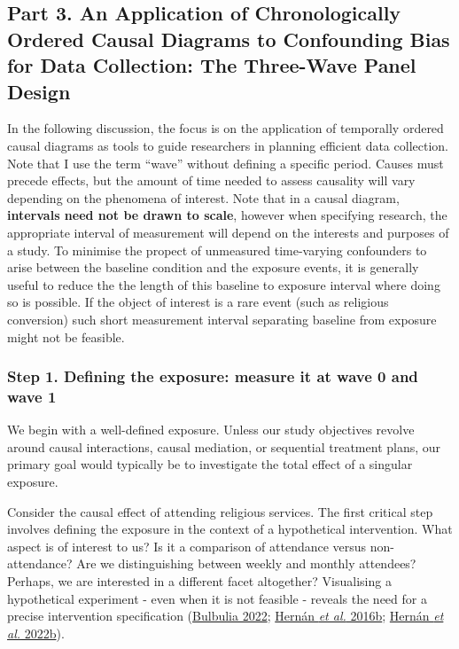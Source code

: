 \documentclass[
  singlecolumn]{article}
\begin{document}
\hypertarget{part-3.-an-application-of-chronologically-ordered-causal-diagrams-to-confounding-bias-for-data-collection-the-three-wave-panel-design}{%
\subsection{Part 3. An Application of Chronologically Ordered Causal
Diagrams to Confounding Bias for Data Collection: The Three-Wave Panel
Design}\label{part-3.-an-application-of-chronologically-ordered-causal-diagrams-to-confounding-bias-for-data-collection-the-three-wave-panel-design}}

In the following discussion, the focus is on the application of
temporally ordered causal diagrams as tools to guide researchers in
planning efficient data collection. Note that I use the term ``wave''
without defining a specific period. Causes must precede effects, but the
amount of time needed to assess causality will vary depending on the
phenomena of interest. Note that in a causal diagram, \textbf{intervals
need not be drawn to scale}, however when specifying research, the
appropriate interval of measurement will depend on the interests and
purposes of a study. To minimise the propect of unmeasured time-varying
confounders to arise between the baseline condition and the exposure
events, it is generally useful to reduce the the length of this baseline
to exposure interval where doing so is possible. If the object of
interest is a rare event (such as religious conversion) such short
measurement interval separating baseline from exposure might not be
feasible.

\hypertarget{step-1.-defining-the-exposure-measure-it-at-wave-0-and-wave-1}{%
\subsubsection{Step 1. Defining the exposure: measure it at wave 0 and
wave
1}\label{step-1.-defining-the-exposure-measure-it-at-wave-0-and-wave-1}}

We begin with a well-defined exposure. Unless our study objectives
revolve around causal interactions, causal mediation, or sequential
treatment plans, our primary goal would typically be to investigate the
total effect of a singular exposure.

Consider the causal effect of attending religious services. The first
critical step involves defining the exposure in the context of a
hypothetical intervention. What aspect is of interest to us? Is it a
comparison of attendance versus non-attendance? Are we distinguishing
between weekly and monthly attendees? Perhaps, we are interested in a
different facet altogether? Visualising a hypothetical experiment - even
when it is not feasible - reveals the need for a precise intervention
specification (\protect\hyperlink{ref-bulbulia2022}{Bulbulia 2022};
\protect\hyperlink{ref-hernuxe1n2016a}{Hernán \emph{et al.} 2016b};
\protect\hyperlink{ref-hernuxe1n2022}{Hernán \emph{et al.} 2022b}).
\end{document}
